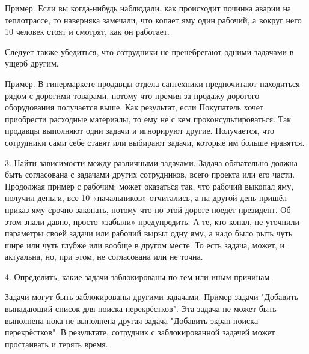 \documentclass{../industrial-development}
\begin{document}
Пример. Если вы когда-нибудь наблюдали, как происходит починка аварии на теплотрассе, то наверняка замечали, что копает яму один рабочий, а вокруг него 10 человек стоят и смотрят, как он работает.

Следует также убедиться, что сотрудники не пренебрегают одними задачами в ущерб другим.

Пример. В гипермаркете продавцы отдела сантехники предпочитают находиться рядом с дорогими товарами, потому что премия за продажу дорогого оборудования получается выше. Как результат, если Покупатель хочет приобрести расходные материалы, то ему не с кем проконсультироваться. Так продавцы выполняют одни задачи и игнорируют другие. Получается, что сотрудники сами себе ставят или выбирают задачи, которые им больше нравятся.

3. Найти зависимости между различными задачами.
Задача обязательно должна быть согласована с задачами других сотрудников, всего проекта или его части. Продолжая пример с рабочим: может оказаться так, что рабочий выкопал яму, получил деньги, все 10 «начальников» отчитались, а на другой день пришёл приказ яму срочно закопать, потому что по этой дороге поедет президент. Об этом знали давно, просто «забыли» предупредить. А те, кто копал, не уточнили параметры своей задачи или рабочий вырыл одну яму, а надо было рыть чуть шире или чуть глубже или вообще в другом месте. То есть задача, может, и актуальна, но, при этом, не согласована или не точна.

4. Определить, какие задачи заблокированы по тем или иным причинам. 

Задачи могут быть заблокированы другими задачами. Пример задачи "Добавить выпадающий список для поиска перекрёстков". Эта задача не может быть выполнена пока не выполнена другая задача "Добавить экран поиска перекрёстков". В результате, сотрудник с заблокированной задачей может простаивать и терять время.
\end{document}
